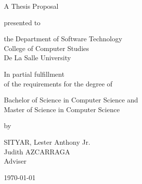 %
%
%                 

\begin{titlepage}
\centering



\vspace{1.5cm}

A Thesis Proposal\\

\vspace{0.5cm}

presented to\\

\vspace{0.5cm}

the Department of Software Technology\\
College of Computer Studies\\
De La Salle University

\vspace{1cm}

In partial fulfillment\\
of the requirements for the degree of\\

\vspace{0.5cm}

Bachelor of Science in Computer Science and \\
Master of Science in Computer Science






\vspace{1.75cm}

by \\


\vspace{1cm}

SITYAR, Lester Anthony Jr.  \\

\vspace{1.75cm}
Judith AZCARRAGA \\
Adviser

\vspace{1.75cm}
\today
\end{titlepage}
